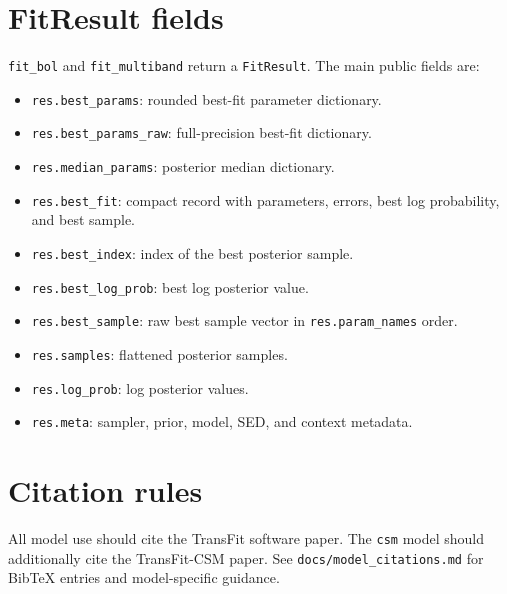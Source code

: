 \documentclass[11pt]{article}
\begin{document}
\section{FitResult fields}

\texttt{fit\_bol} and \texttt{fit\_multiband} return a \texttt{FitResult}.
The main public fields are:

\begin{itemize}[leftmargin=*]
  \item \texttt{res.best\_params}: rounded best-fit parameter dictionary.
  \item \texttt{res.best\_params\_raw}: full-precision best-fit dictionary.
  \item \texttt{res.median\_params}: posterior median dictionary.
  \item \texttt{res.best\_fit}: compact record with parameters, errors,
    best log probability, and best sample.
  \item \texttt{res.best\_index}: index of the best posterior sample.
  \item \texttt{res.best\_log\_prob}: best log posterior value.
  \item \texttt{res.best\_sample}: raw best sample vector in
    \texttt{res.param\_names} order.
  \item \texttt{res.samples}: flattened posterior samples.
  \item \texttt{res.log\_prob}: log posterior values.
  \item \texttt{res.meta}: sampler, prior, model, SED, and context metadata.
\end{itemize}

\section{Citation rules}

All model use should cite the TransFit software paper.  The \texttt{csm} model
should additionally cite the TransFit-CSM paper.  See
\texttt{docs/model\_citations.md} for BibTeX entries and model-specific
guidance.
\end{document}
